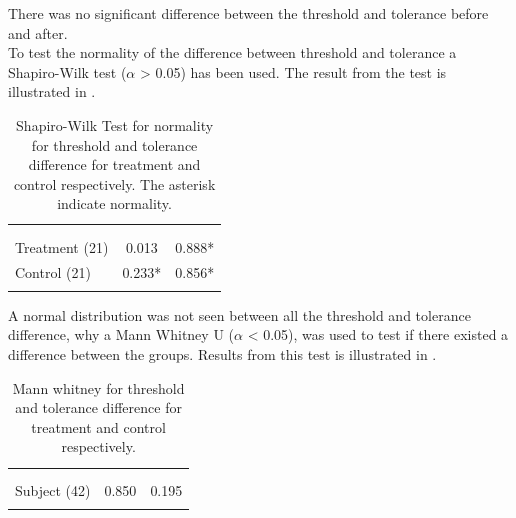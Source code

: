 There was no significant difference between the threshold and tolerance before and after.\\

To test the normality of the difference between threshold and tolerance a Shapiro-Wilk test ($\alpha$ > 0.05) has been used. The result from the test is illustrated in .

\begin{longtable} {l|c|c}
 \rowcolor[HTML]{C0C0C0} 
  \color[HTML]{000000}{} & 
 \multicolumn{1}{c|}{ \color[HTML]{000000}{\textbf{Threshold}}} & \multicolumn{1}{c}{ \color[HTML]{000000}{\textbf{Tolerance}}}  	\\  \rule{0pt}{3ex} 
  \cellcolor[HTML]{C0C0C0}{} &
 \multicolumn{1}{c|}{ \cellcolor[HTML]{C0C0C0}{Difference }} & \multicolumn{1}{|c}{ \cellcolor[HTML]{C0C0C0}{Difference}}  	\\ \hline
Treatment (21) & 0.013 &  0.888* \\ \hline
Control (21) & 0.233*  & 0.856*  \\ \hline
	\caption{Shapiro-Wilk Test for normality for threshold and tolerance difference for treatment and control respectively. The asterisk indicate normality.}
	\label{tab:ShapiroWilk2}
\end{longtable}
\vspace{-.5cm}

A normal distribution was not seen between all the threshold and tolerance difference, why a Mann Whitney U ($\alpha$ < 0.05), was used to test if there existed a difference between the groups. Results from this test is illustrated in .

\begin{longtable} {l|c|c}
 \rowcolor[HTML]{C0C0C0} 
  \color[HTML]{000000}{} & 
 \multicolumn{1}{c|}{ \color[HTML]{000000}{\textbf{Threshold}}} & \multicolumn{1}{c}{ \color[HTML]{000000}{\textbf{Tolerance}}}  	\\  \rule{0pt}{3ex} 
  \cellcolor[HTML]{C0C0C0}{} &
 \multicolumn{1}{c|}{ \cellcolor[HTML]{C0C0C0}{Difference }} & \multicolumn{1}{|c}{ \cellcolor[HTML]{C0C0C0}{Difference}}  	\\ \hline
Subject (42) & 0.850 & 0.195 \\ \hline
	\caption{Mann whitney for threshold and tolerance difference for treatment and control respectively.}	\label{tab:MannWhitney1}
\end{longtable}
\vspace{-.5cm}

